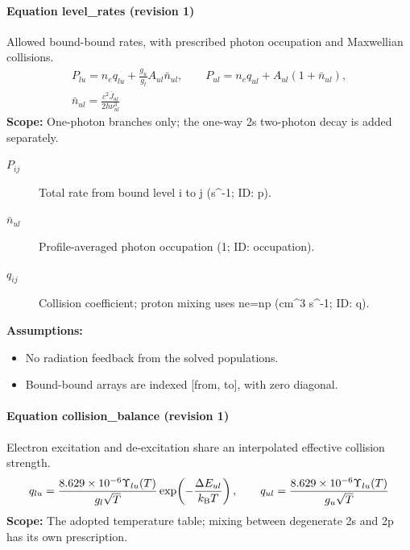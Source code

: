 
\paragraph{Equation level\_rates (revision 1)}
Allowed bound-bound rates, with prescribed photon occupation and Maxwellian collisions.
\begin{equation}
\begin{aligned}
P_{lu}=n_e q_{lu}+\frac{g_u}{g_l}A_{ul}\bar n_{ul},\qquad P_{ul}=n_e q_{ul}+A_{ul}(1+\bar n_{ul}),\\\bar n_{ul}=\frac{c^2\overline J_{ul}}{2h\nu_{ul}^3}
\end{aligned}
\label{eq:escape.hydrogen_5f_nlte:level_5f_rates:1}
\end{equation}
\noindent\textbf{Scope:} One-photon branches only; the one-way 2s two-photon decay is added separately.

\begin{description}
\item[$P_{ij}$] Total rate from bound level i to j (s\textasciicircum{}-1; ID: p).
\item[$\bar n_{ul}$] Profile-averaged photon occupation (1; ID: occupation).
\item[$q_{ij}$] Collision coefficient; proton mixing uses ne=np (cm\textasciicircum{}3 s\textasciicircum{}-1; ID: q).
\end{description}

\noindent\textbf{Assumptions:}
\begin{itemize}
\item No radiation feedback from the solved populations.
\item Bound-bound arrays are indexed [from, to], with zero diagonal.
\end{itemize}

\paragraph{Equation collision\_balance (revision 1)}
Electron excitation and de-excitation share an interpolated effective collision strength.
\begin{equation}
\begin{aligned}
q_{lu}=\frac{8.629\times10^{-6}\Upsilon_{lu}(T)}{g_l\sqrt{T}}\exp\!\left(-\frac{\Delta E_{ul}}{k_{\rm B}T}\right),\qquad q_{ul}=\frac{8.629\times10^{-6}\Upsilon_{lu}(T)}{g_u\sqrt{T}}
\end{aligned}
\label{eq:escape.hydrogen_5f_nlte:collision_5f_balance:1}
\end{equation}
\noindent\textbf{Scope:} The adopted temperature table; mixing between degenerate 2s and 2p has its own prescription.

